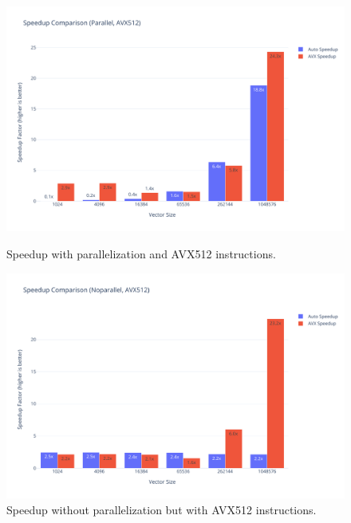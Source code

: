 \documentclass[10pt]{report}
\begin{document}
\begin{figure}[H]
  \centering
  \begin{minipage}{0.49\textwidth}
    \centering
    \includegraphics[width=\textwidth]{../images/speedup/softmax_speedup_parallel_avx512.pdf}
    \caption{Speedup with parallelization and AVX512 instructions.}
    \label{fig:speedup_parallel_avx512}
  \end{minipage}
  \hfill
  \begin{minipage}{0.49\textwidth}
    \centering
    \includegraphics[width=\textwidth]{../images/speedup/softmax_speedup_noparallel_avx512.pdf}
    \caption{Speedup without parallelization but with AVX512 instructions.}
    \label{fig:speedup_noparallel_avx512}
  \end{minipage}
\end{figure}
\end{document}
